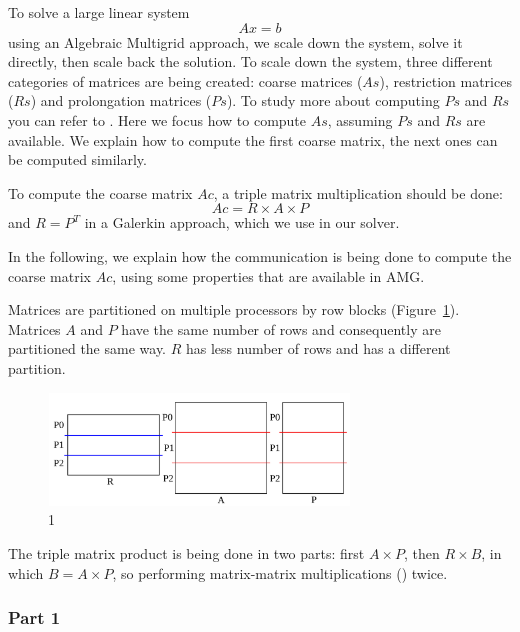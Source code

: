 To solve a large linear system 
\begin{equation}
 Ax = b
\end{equation}
using an Algebraic Multigrid approach, we scale down the system, solve it directly, then scale back the solution. To scale down the system, three different categories of matrices are being created: coarse matrices ($As$), restriction matrices ($Rs$) and prolongation matrices ($Ps$). To study more about computing $Ps$ and $Rs$ you can refer to . Here we focus how to compute $As$, assuming $Ps$ and $Rs$ are available. We explain how to compute the first coarse matrix, the next ones can be computed similarly.

To compute the coarse matrix $Ac$, a triple matrix multiplication should be done:
\begin{equation}
 Ac = R \times A \times P
\end{equation}
and $R = P^T$ in a Galerkin approach, which we use in our solver.

In the following, we explain how the communication is being done to compute the coarse matrix $Ac$, using some properties that are available in AMG.

Matrices are partitioned on multiple processors by row blocks (Figure~\ref{fig:partition}). Matrices $A$ and $P$ have the same number of rows and consequently are partitioned the same way. $R$ has less number of rows and has a different partition.

\begin{figure}[tbh]
 \centering
 \includegraphics[width=8cm,height=3cm]{./figures/partition.pdf}
 \caption{1}
 \label{fig:partition}
\end{figure}

The triple matrix product is being done in two parts: first $A \times P$, then $R \times B$, in which $B = A \times P$, so performing matrix-matrix multiplications (\mm) twice.

\subsubsection{Part 1}

